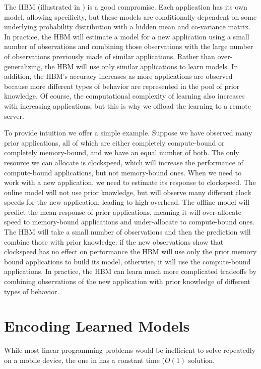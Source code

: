 The HBM (illustrated in ) is a good compromise.  Each
application has its own model, allowing specificity, but these models
are conditionally dependent on some underlying probability
distribution with a hidden mean and co-variance matrix.  In practice,
the HBM will estimate a model for a new application using a small
number of observations and combining those observations with the large
number of observations previously made of similar applications.
Rather than over-generalizing, the HBM will use only similar
applications to learn models.  In addition, the HBM's accuracy
increases as more applications are observed because more different
types of behavior are represented in the pool of prior knowledge.  Of
course, the computational complexity of learning also increases with
increasing applications, but this is why we offload the learning to a
remote server.

To provide intuition we offer a simple example.  Suppose we have
observed many prior applications, all of which are either completely
compute-bound or completely memory-bound, and we have an equal number
of both.  The only resource we can allocate is clockspeed, which will
increase the performance of compute-bound applications, but not
memory-bound ones.  When we need to work with a new application, we
need to estimate its response to clockspeed.  The online model will
not use prior knowledge, but will observe many different clock speeds
for the new application, leading to high overhead.  The offline model
will predict the mean response of prior applications, meaning it will
over-allocate speed to memory-bound applications and under-allocate to
compute-bound ones.  The HBM will take a small number of observations
and then the prediction will combine those with prior knowledge: if
the new observations show that clockspeed has no effect on performance
the HBM will use only the prior memory bound applications to build its
model, otherwise, it will use the compute-bound applications.  In
practice, the HBM can learn much more complicated tradeoffs by
combining observations of the new application with prior knowledge of
different types of behavior.

\section{Encoding Learned Models}


  While most linear programming problems would be inefficient to solve
repeatedly on a mobile device, the one in  has a
constant time ($O(1)$ solution.

